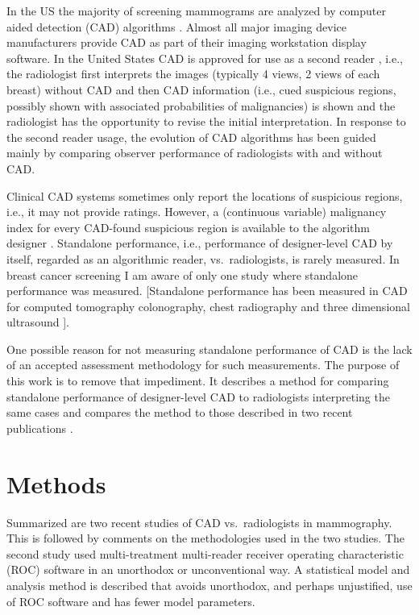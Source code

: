 \documentclass[
]{book}
\begin{document}
In the US the majority of screening mammograms are analyzed by computer aided detection (CAD) algorithms \citep{rao2010widely}. Almost all major imaging device manufacturers provide CAD as part of their imaging workstation display software. In the United States CAD is approved for use as a second reader \citep{fda2018guidance}, i.e., the radiologist first interprets the images (typically 4 views, 2 views of each breast) without CAD and then CAD information (i.e., cued suspicious regions, possibly shown with associated probabilities of malignancies) is shown and the radiologist has the opportunity to revise the initial interpretation. In response to the second reader usage, the evolution of CAD algorithms has been guided mainly by comparing observer performance of radiologists with and without CAD.

Clinical CAD systems sometimes only report the locations of suspicious regions, i.e., it may not provide ratings. However, a (continuous variable) malignancy index for every CAD-found suspicious region is available to the algorithm designer \citep{edwards2002maximum}. Standalone performance, i.e., performance of designer-level CAD by itself, regarded as an algorithmic reader, vs.~radiologists, is rarely measured. In breast cancer screening I am aware of only one study \citep{hupse2013standalone} where standalone performance was measured. {[}Standalone performance has been measured in CAD for computed tomography colonography, chest radiography and three dimensional ultrasound \citep{hein2010computeraided, summers2008performance, taylor2006computerassisted, deBoo2011computeraided, tan2012computeraided}{]}.

One possible reason for not measuring standalone performance of CAD is the lack of an accepted assessment methodology for such measurements. The purpose of this work is to remove that impediment.
It describes a method for comparing standalone performance of designer-level CAD to radiologists interpreting the same cases and compares the method to those described in two recent publications \citep{hupse2013standalone, kooi2016comparison}.

\hypertarget{standalone-cad-radiologists-methods}{%
\section{Methods}\label{standalone-cad-radiologists-methods}}

Summarized are two recent studies of CAD vs.~radiologists in mammography. This is followed by comments on the methodologies used in the two studies. The second study used multi-treatment multi-reader receiver operating characteristic (ROC) software in an unorthodox or unconventional way. A statistical model and analysis method is described that avoids unorthodox, and perhaps unjustified, use of ROC software and has fewer model parameters.
\end{document}
